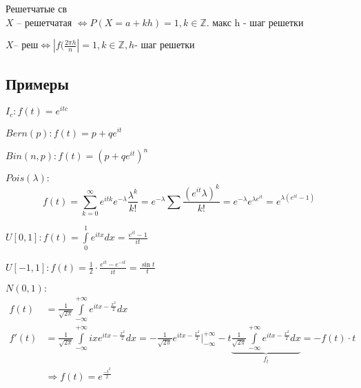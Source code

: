 \documentclass{article}
\begin{document}
    \begin{definition}{Решетчатые св}\\
        $X$ -- решетчатая $\Leftrightarrow P(X = a + kh) = 1, k \in \mathbb Z$. макс h - шаг решетки
    \end{definition}
    \begin{claim}
        $X \text{-- реш}  \Leftrightarrow | f(\frac{2\pi h}{n} | = 1, k \in \mathbb{Z}, h \text{- шаг решетки}$
    \end{claim}
    \subsection{Примеры}
    \begin{example}
        $I_c: f(t) = e^{itc}$
    \end{example}
    \begin{example}
        $Bern(p): f(t) = p + qe^{it}$
    \end{example}
    \begin{example}
        $Bin(n, p): f(t) = (p + qe^{it})^n$ %
    \end{example}
    \begin{example}
        $Pois(\lambda): $
        $$f(t) = \sum\limits_{k=0}^\infty e^{itk} e^{-\lambda} \frac{\lambda^k}{k!} = e^{-\lambda} \sum \frac{(e^{it}\lambda)^k}{k!} = e^{-\lambda}e^{\lambda e^{it}} = e^{\lambda(e^{it} - 1)}$$
    \end{example}
    \begin{example}
        $U[0, 1]: f(t) = \int\limits_0^1 e^{itx}dx = \frac{e^{it} - 1}{it}$
    \end{example}
     \begin{example}
        $U[-1, 1]: f(t) = \frac{1}{2} \cdot \frac{e^{it} - e^{-it}}{it} = \frac{\sin{t}}{t}$
    \end{example}
    \begin{example}
        $N(0, 1):$
        \begin{align*}
            f(t) &= \frac{1} {\sqrt{2\pi}} \int\limits_{-\infty}^{+\infty} e^{itx - \frac{x^2}{2}} dx\\
            f'(t) &= \frac{1} {\sqrt{2\pi}}  \int\limits_{-\infty}^{+\infty} ixe^{itx - \frac{x^2}{2}}dx = 
            -\frac{1}{\sqrt{2\pi}}e^{itx - \frac{x^2}{2}}\bigg|_{-\infty}^{+\infty} - t\underbrace{\frac{1}{\sqrt{2\pi}}\int\limits_{-\infty}^{+\infty} e^{itx - \frac{x^2}{2}}dx}_{f_t} = -f(t) \cdot t \\
            &\Rightarrow f(t) = e^{\frac{-t^2}{2}}
        \end{align*}
    \end{example}
\end{document}
